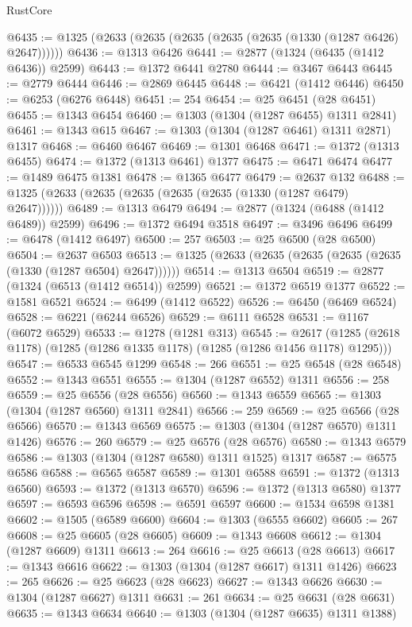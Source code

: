 \begin{lexlean}{RustCore}
\begin{coremodule}
@6435 := @1325 (@2633 (@2635 (@2635 (@2635 (@2635 (@1330 (@1287 @6426) @2647))))))
@6436 := @1313 @6426
@6441 := @2877 (@1324 (@6435 (@1412 @6436)) @2599)
@6443 := @1372 @6441 @2780
@6444 := @3467 @6443
@6445 := @2779 @6444
@6446 := @2869 @6445
@6448 := @6421 (@1412 @6446)
@6450 := @6253 (@6276 @6448)
@6451 := 254
@6454 := @25 @6451 (@28 @6451)
@6455 := @1343 @6454
@6460 := @1303 (@1304 (@1287 @6455) @1311 @2841)
@6461 := @1343 @615
@6467 := @1303 (@1304 (@1287 @6461) @1311 @2871) @1317
@6468 := @6460 @6467
@6469 := @1301 @6468
@6471 := @1372 (@1313 @6455)
@6474 := @1372 (@1313 @6461) @1377
@6475 := @6471 @6474
@6477 := @1489 @6475 @1381
@6478 := @1365 @6477
@6479 := @2637 @132
@6488 := @1325 (@2633 (@2635 (@2635 (@2635 (@2635 (@1330 (@1287 @6479) @2647))))))
@6489 := @1313 @6479
@6494 := @2877 (@1324 (@6488 (@1412 @6489)) @2599)
@6496 := @1372 @6494 @3518
@6497 := @3496 @6496
@6499 := @6478 (@1412 @6497)
@6500 := 257
@6503 := @25 @6500 (@28 @6500)
@6504 := @2637 @6503
@6513 := @1325 (@2633 (@2635 (@2635 (@2635 (@2635 (@1330 (@1287 @6504) @2647))))))
@6514 := @1313 @6504
@6519 := @2877 (@1324 (@6513 (@1412 @6514)) @2599)
@6521 := @1372 @6519 @1377
@6522 := @1581 @6521
@6524 := @6499 (@1412 @6522)
@6526 := @6450 (@6469 @6524)
@6528 := @6221 (@6244 @6526)
@6529 := @6111 @6528
@6531 := @1167 (@6072 @6529)
@6533 := @1278 (@1281 @313)
@6545 := @2617 (@1285 (@2618 @1178) (@1285 (@1286 @1335 @1178) (@1285 (@1286 @1456 @1178) @1295)))
@6547 := @6533 @6545 @1299
@6548 := 266
@6551 := @25 @6548 (@28 @6548)
@6552 := @1343 @6551
@6555 := @1304 (@1287 @6552) @1311
@6556 := 258
@6559 := @25 @6556 (@28 @6556)
@6560 := @1343 @6559
@6565 := @1303 (@1304 (@1287 @6560) @1311 @2841)
@6566 := 259
@6569 := @25 @6566 (@28 @6566)
@6570 := @1343 @6569
@6575 := @1303 (@1304 (@1287 @6570) @1311 @1426)
@6576 := 260
@6579 := @25 @6576 (@28 @6576)
@6580 := @1343 @6579
@6586 := @1303 (@1304 (@1287 @6580) @1311 @1525) @1317
@6587 := @6575 @6586
@6588 := @6565 @6587
@6589 := @1301 @6588
@6591 := @1372 (@1313 @6560)
@6593 := @1372 (@1313 @6570)
@6596 := @1372 (@1313 @6580) @1377
@6597 := @6593 @6596
@6598 := @6591 @6597
@6600 := @1534 @6598 @1381
@6602 := @1505 (@6589 @6600)
@6604 := @1303 (@6555 @6602)
@6605 := 267
@6608 := @25 @6605 (@28 @6605)
@6609 := @1343 @6608
@6612 := @1304 (@1287 @6609) @1311
@6613 := 264
@6616 := @25 @6613 (@28 @6613)
@6617 := @1343 @6616
@6622 := @1303 (@1304 (@1287 @6617) @1311 @1426)
@6623 := 265
@6626 := @25 @6623 (@28 @6623)
@6627 := @1343 @6626
@6630 := @1304 (@1287 @6627) @1311
@6631 := 261
@6634 := @25 @6631 (@28 @6631)
@6635 := @1343 @6634
@6640 := @1303 (@1304 (@1287 @6635) @1311 @1388)

\end{coremodule}
\end{lexlean}
